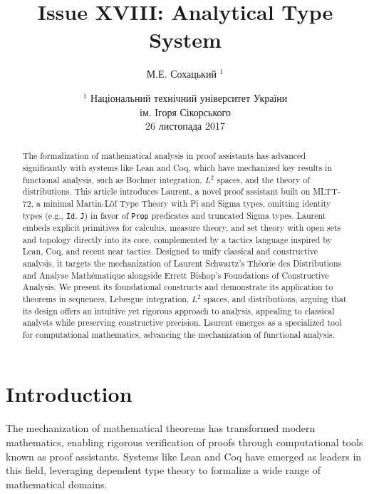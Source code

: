 \documentclass{article}
\begin{document}
\author { М.Е. Сохацький $^1$ }
\title { Issue XVIII: Analytical Type System }
\date{ \small $^1$ Національний технічний університет України \\
       ім. Ігоря Сікорського \\
       26 листопада 2017 }
\maketitle

\begin{abstract}

  The formalization of mathematical analysis in proof assistants has
  advanced significantly with systems like Lean and Coq, which have
  mechanized key results in functional analysis, such as Bochner
  integration, $L^2$ spaces, and the theory of distributions. This
  article introduces Laurent, a novel proof assistant built on MLTT-72,
  a minimal Martin-Löf Type Theory with Pi and Sigma types, omitting
  identity types (e.g., \texttt{Id}, \texttt{J}) in favor of
  \texttt{Prop} predicates and truncated Sigma types. Laurent
  embeds explicit primitives for calculus, measure theory, and set
  theory with open sets and topology directly into its core,
  complemented by a tactics language inspired by Lean, Coq, and
  recent near tactics. Designed to unify classical and constructive
  analysis, it targets the mechanization of Laurent Schwartz’s Théorie
  des Distributions and Analyse Mathématique alongside Errett Bishop’s
  Foundations of Constructive Analysis. We present its foundational
  constructs and demonstrate its application to theorems in sequences,
  Lebesgue integration, $L^2$ spaces, and distributions, arguing that
  its design offers an intuitive yet rigorous approach to analysis,
  appealing to classical analysts while preserving constructive
  precision. Laurent emerges as a specialized tool for computational
  mathematics, advancing the mechanization of functional analysis.

\end{abstract}

\newpage
\tableofcontents
\newpage

\section{Introduction}
The mechanization of mathematical theorems has transformed modern mathematics,
enabling rigorous verification of proofs through computational tools known as
proof assistants. Systems like Lean and Coq have emerged as leaders in this field,
leveraging dependent type theory to formalize a wide range of mathematical domains.
\end{document}
